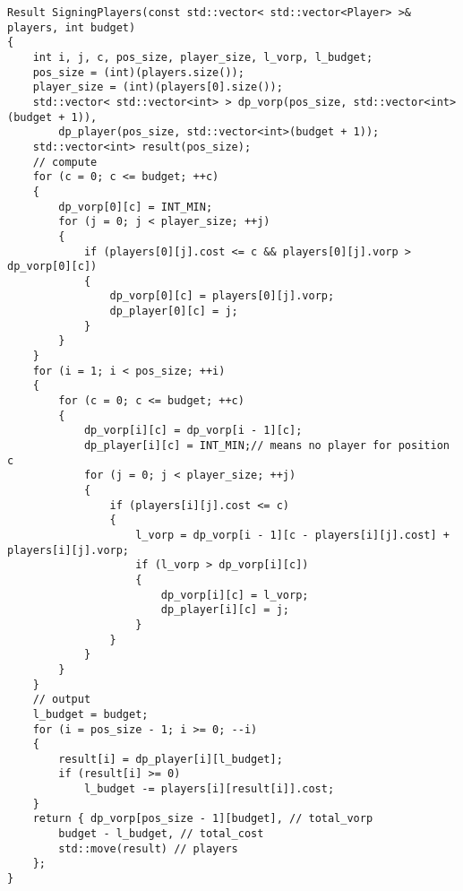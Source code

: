 \begin{verbatim}
Result SigningPlayers(const std::vector< std::vector<Player> >& players, int budget)
{
    int i, j, c, pos_size, player_size, l_vorp, l_budget;
    pos_size = (int)(players.size());
    player_size = (int)(players[0].size());
    std::vector< std::vector<int> > dp_vorp(pos_size, std::vector<int>(budget + 1)),
        dp_player(pos_size, std::vector<int>(budget + 1));
    std::vector<int> result(pos_size);
    // compute
    for (c = 0; c <= budget; ++c)
    {
        dp_vorp[0][c] = INT_MIN;
        for (j = 0; j < player_size; ++j)
        {
            if (players[0][j].cost <= c && players[0][j].vorp > dp_vorp[0][c])
            {
                dp_vorp[0][c] = players[0][j].vorp;
                dp_player[0][c] = j;
            }
        }
    }
    for (i = 1; i < pos_size; ++i)
    {
        for (c = 0; c <= budget; ++c)
        {
            dp_vorp[i][c] = dp_vorp[i - 1][c];
            dp_player[i][c] = INT_MIN;// means no player for position c
            for (j = 0; j < player_size; ++j)
            {
                if (players[i][j].cost <= c)
                {
                    l_vorp = dp_vorp[i - 1][c - players[i][j].cost] + players[i][j].vorp;
                    if (l_vorp > dp_vorp[i][c])
                    {
                        dp_vorp[i][c] = l_vorp;
                        dp_player[i][c] = j;
                    }
                }
            }
        }
    }
    // output
    l_budget = budget;
    for (i = pos_size - 1; i >= 0; --i)
    {
        result[i] = dp_player[i][l_budget];
        if (result[i] >= 0)
            l_budget -= players[i][result[i]].cost;
    }
    return { dp_vorp[pos_size - 1][budget], // total_vorp
        budget - l_budget, // total_cost
        std::move(result) // players
    };
}
\end{verbatim}

